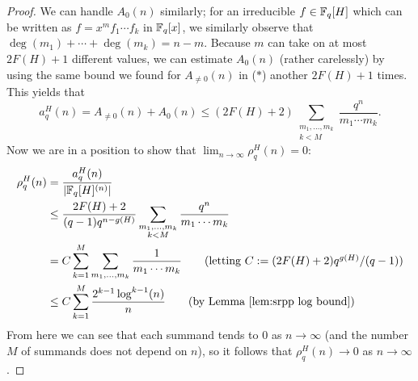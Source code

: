 \begin{proof}
	We can handle $A_0(n)$ similarly; for an irreducible $f\in \mathbb{F}_q[H]$ which can be written as $f= x^m f_1\cdots f_k$ in $\mathbb{F}_q[x]$, we similarly observe that $\deg(m_1)+\cdots+\deg(m_k) = n-m$. 
	Because $m$ can take on at most $2F(H)+1$ different values, we can estimate $A_0(n)$ (rather carelessly) by using the same bound we found for $A_{\neq0}(n)$ in ($*$) another $2F(H)+1$ times.
	This yields that
	\[a_q^H(n) = A_{\neq0}(n) + A_0(n) \le (2F(H)+2) \sum_{\substack{m_1,\dots,m_k \\ k < M}} \frac{q^n}{m_1\cdots m_k}. \]
	Now we are in a position to show that $\lim_{n\to\infty}\rho_q^H(n) = 0$:
	\begin{align*}
	\rho_q^H(n) 
	&= \frac{a_q^H(n)}{|\Fq[H]^{(n)}|} \\
	&\le \frac{2F(H)+2}{(q-1)q^{n-g(H)}} \sum_{\substack{m_1,\dots,m_k \\ k<M}} \frac{q^n}{m_1\cdots m_k} \\
	&=C \sum_{k=1}^M \sum_{m_1,\dots,m_k} \frac{1}{m_1\cdots m_k} \tag{letting $C := (2F(H)+2)q^{g(H)}/(q-1)$}\\
	&\le C \sum_{k=1}^M \frac{2^{k-1} \log^{k-1}(n)}{n} \tag{by Lemma \ref{lem:srpp log bound}} \\
	\end{align*}
	From here we can see that each summand tends to $0$ as $n\to\infty$ (and the number $M$ of summands does not depend on $n$), so it follows that $\rho_q^H(n) \to 0$ as $n\to \infty$.
\end{proof}